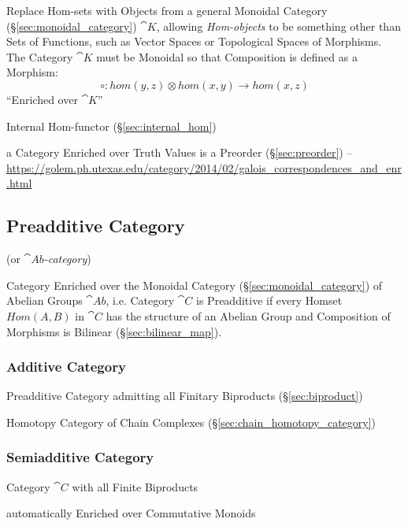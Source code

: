 Replace Hom-sets with Objects from a general Monoidal Category
(\S\ref{sec:monoidal_category}) $\cat{K}$, allowing \emph{Hom-objects}
to be something other than Sets of Functions, such as Vector Spaces or
Topological Spaces of Morphisms. The Category $\cat{K}$ must be
Monoidal so that Composition is defined as a Morphism:
\[
  \circ : hom(y,z) \otimes hom(x,y) \rightarrow hom(x,z)
\]
``Enriched over $\cat{K}$''

Internal Hom-functor (\S\ref{sec:internal_hom})

a Category Enriched over Truth Values is a Preorder
(\S\ref{sec:preorder}) --
\url{https://golem.ph.utexas.edu/category/2014/02/galois_correspondences_and_enr.html}



\subsection{Preadditive Category}\label{sec:preadditive_category}

(or \emph{$\cat{Ab}$-category})

Category Enriched over the Monoidal Category
(\S\ref{sec:monoidal_category}) of Abelian Groups $\cat{Ab}$, i.e.
Category $\cat{C}$ is Preadditive if every Homset $Hom(A,B)$ in
$\cat{C}$ has the structure of an Abelian Group and Composition of
Morphisms is Bilinear (\S\ref{sec:bilinear_map}).



\subsubsection{Additive Category}\label{sec:additive_category}

Preadditive Category admitting all Finitary Biproducts
(\S\ref{sec:biproduct})

\fist Homotopy Category of Chain Complexes (\S\ref{sec:chain_homotopy_category})



\subsubsection{Semiadditive Category}\label{sec:semiadditive_category}

Category $\cat{C}$ with all Finite Biproducts

automatically Enriched over Commutative Monoids

